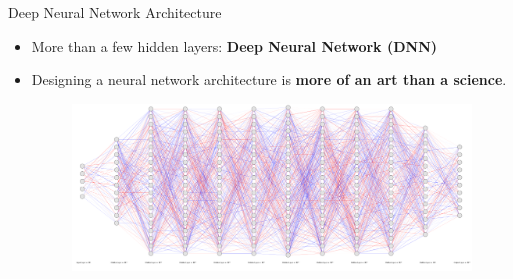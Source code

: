 \documentclass[serif, aspectratio=169]{beamer}
\begin{document}
\begin{frame}[t]{Deep Neural Network Architecture}
\begin{itemize}
    \item More than a few hidden layers: \textbf{Deep Neural Network (DNN)}
    \item Designing a neural network architecture is \textbf{more of an art than a science}.
        \begin{figure}[bh]
            \includegraphics[keepaspectratio, scale=0.3]{pic/3/huge-nn.png}
        \end{figure}
\end{itemize}
\end{frame}
\end{document}
